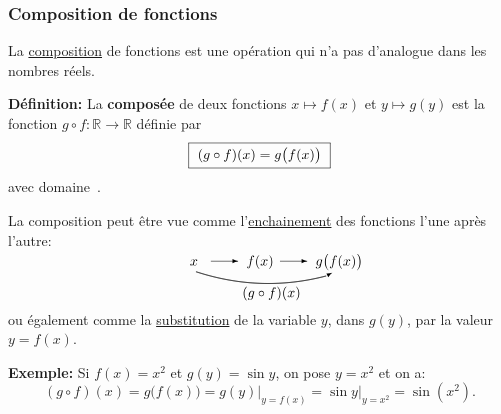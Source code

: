 \documentclass[10pt]{beamer}
\newcommand{\R}{\mathbb R}
\begin{document}
\begin{frame}
\frametitle{\bf Composition de fonctions}
\medskip 

{\small 
La \underline{composition} de fonctions est une op\'eration qui n'a pas 
d'analogue dans les nombres r\'eels. }
\vspace*{1mm}

\pause
{\bf D\'efinition:} 
La {\bf compos\'ee} de deux fonctions $x\mapsto f(x)$ et $y\mapsto g(y)$ 
est la fonction $g\circ f:\R\rightarrow\R$ d\'efinie par
$$
\mbox{\framebox{\ $(g\circ f)(x)=g\big(f(x)\big)$\ }} 
$$
avec domaine\ .
\vspace*{1mm}

\pause
La composition peut \^etre vue comme l'\underline{enchainement} 
des fonctions l'une apr\`es l'autre: 
$$
\begin{picture}(80,30)(10,-10)
\setlength{\unitlength}{1.5pt}
\put(0,10){$x$}
\put(10,12){\vector(1,0){13}}
\put(27,10){$f(x)$}
\put(43,12){\vector(1,0){13}}
\put(60,10){$g\big(f(x)\big)$}
\qbezier(3,7)(34,-3)(65,5)
\put(65,5){\vector(2,1){3}}
\put(25,-5){$(g\circ f)(x)$}
\end{picture}
$$
ou \'egalement comme la \underline{substitution} de la variable $y$, 
dans $g(y)$, par la valeur $y=f(x)$.   
\vspace*{1mm}

\pause
{\small 
{\bf Exemple:}\quad
Si $f(x)=x^2$ et $g(y)=\sin y$, on pose $y=x^2$ et on a: 
$$
(g\circ f)(x) = g\big(f(x)\big) = g(y)\Big|_{y=f(x)} 
= \sin y\Big|_{y=x^2} = \sin(x^2). 
$$
}

\end{frame}

\end{document}
